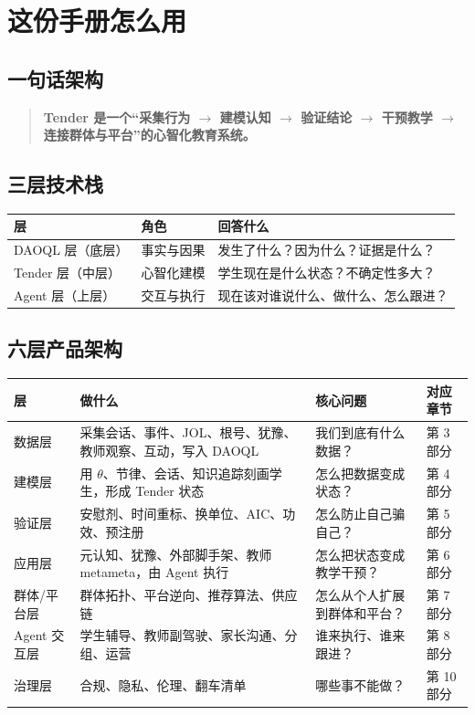 \documentclass[UTF8,a4paper,11pt]{ctexart}
\begin{document}
\section{这份手册怎么用}

\subsection{一句话架构}

\begin{quote}
\textbf{Tender 是一个“采集行为 $\to$ 建模认知 $\to$ 验证结论 $\to$ 干预教学 $\to$ 连接群体与平台”的心智化教育系统。}
\end{quote}

\subsection{三层技术栈}

\begin{center}
\begin{longtable}{@{}p{2.6cm}p{4.2cm}p{7.0cm}@{}}
\toprule
\textbf{层} & \textbf{角色} & \textbf{回答什么} \\
\midrule
DAOQL 层（底层） & 事实与因果 & 发生了什么？因为什么？证据是什么？ \\
Tender 层（中层） & 心智化建模 & 学生现在是什么状态？不确定性多大？ \\
Agent 层（上层） & 交互与执行 & 现在该对谁说什么、做什么、怎么跟进？ \\
\bottomrule
\end{longtable}
\end{center}

\subsection{六层产品架构}

\begin{center}
\begin{longtable}{@{}p{2.2cm}p{4.0cm}p{4.4cm}p{4.2cm}@{}}
\toprule
\textbf{层} & \textbf{做什么} & \textbf{核心问题} & \textbf{对应章节} \\
\midrule
数据层 & 采集会话、事件、JOL、根号、犹豫、教师观察、互动，写入 DAOQL & 我们到底有什么数据？ & 第 3 部分 \\
建模层 & 用 $\theta$、节律、会话、知识追踪刻画学生，形成 Tender 状态 & 怎么把数据变成状态？ & 第 4 部分 \\
验证层 & 安慰剂、时间重标、换单位、AIC、功效、预注册 & 怎么防止自己骗自己？ & 第 5 部分 \\
应用层 & 元认知、犹豫、外部脚手架、教师 metameta，由 Agent 执行 & 怎么把状态变成教学干预？ & 第 6 部分 \\
群体/平台层 & 群体拓扑、平台逆向、推荐算法、供应链 & 怎么从个人扩展到群体和平台？ & 第 7 部分 \\
Agent 交互层 & 学生辅导、教师副驾驶、家长沟通、分组、运营 & 谁来执行、谁来跟进？ & 第 8 部分 \\
治理层 & 合规、隐私、伦理、翻车清单 & 哪些事不能做？ & 第 10 部分 \\
\bottomrule
\end{longtable}
\end{center}
\end{document}
